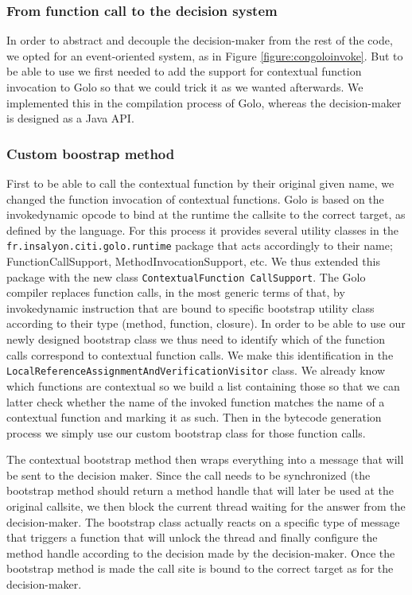 \documentclass{sig-alternate}
\begin{document}
\subsubsection{From function call to the decision system}

In order to abstract and decouple the decision-maker from the rest of the code, we opted for an event-oriented system, as in Figure \ref{figure:congoloinvoke}. But to be able to use we first needed to add the support for contextual function invocation to Golo so that we could trick it as we wanted afterwards. We implemented this in the compilation process of Golo, whereas the decision-maker is designed as a Java API.

\subsubsection{Custom boostrap method}
First to be able to call the contextual function by their original given name, we changed the function invocation of contextual functions. Golo is based on the invokedynamic opcode to bind at the runtime the callsite to the correct target, as defined by the language. For this process it provides several utility classes in the \lstinline|fr.insalyon.citi.golo.runtime| package that acts accordingly to their name; FunctionCallSupport, MethodInvocationSupport, etc. We thus extended this package with the new class \lstinline|ContextualFunction CallSupport|. The Golo compiler replaces function calls, in the most generic terms of that, by invokedynamic instruction that are bound to specific bootstrap utility class according to their type (method, function, closure). In order to be able to use our newly designed bootstrap class we thus need to identify which of the function calls correspond to contextual function calls. We make this identification in the \lstinline|LocalReferenceAssignmentAndVerificationVisitor| class. We already know which functions are contextual so we build a list containing those so that we can latter check whether the name of the invoked function matches the name of a contextual function and marking it as such. Then in the bytecode generation process we simply use our custom bootstrap class for those function calls.

The contextual bootstrap method then wraps everything into a message that will be sent to the decision maker. Since the call needs to be synchronized (the bootstrap method should return a method handle that will later be used at the original callsite, we then block the current thread waiting for the answer from the decision-maker. The bootstrap class actually reacts on a specific type of message that triggers a function that will unlock the thread and finally configure the method handle according to the decision made by the decision-maker. Once the bootstrap method is made the call site is bound to the correct target as for the decision-maker.
\end{document}
